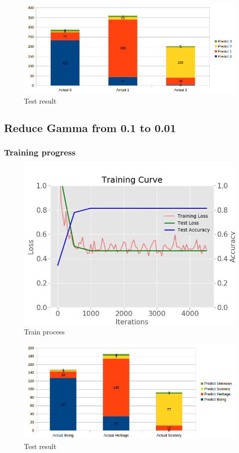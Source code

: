 \documentclass[11pt]{article}
\begin{document}
\begin{figure}[H]
\centering
\includegraphics[width=1\textwidth]{images/70_10_20_result_large_dataset}
\caption{Test result}
\end{figure}


\subsection{Reduce Gamma from 0.1 to 0.01}

\subsubsection{Training progress}

\begin{figure}[H]
\centering
\includegraphics[width=1\textwidth]{images/train_large_dataset_gamma_0_01}
\caption{Train process}
\end{figure}

\begin{figure}[H]
\centering
\includegraphics[width=1\textwidth]{images/test_large_dataset_gamma_0_01}
\caption{Test result}
\end{figure}
\end{document}
